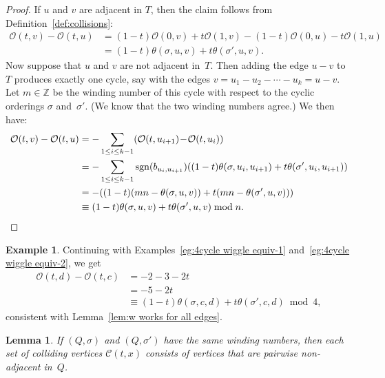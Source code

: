 \documentclass[11pt, letterpaper]{amsart}
\newtheorem{lemma}[theorem]{Lemma}
\theoremstyle{definition}
\newtheorem{example}[theorem]{Example}
\numberwithin{equation}{section}
\def\ZZ{{\mathbb Z}}
\def\O{{\mathcal{O}}}
\newcommand\sgn{\operatorname{sgn}}
\begin{document}
\begin{proof}
If $u$ and $v$ are adjacent in $T$, then the claim follows from Definition~\ref{def:collisions}:
\begin{align*}
\O(t,v)-\O(t,u) &= (1-t) \O(0,v)+t\O(1,v) - (1-t)\O(0,u) - t\O(1,u) \\
&= (1-t) \theta(\sigma,u,v) + t \theta(\sigma',u,v). 
\end{align*}
Now suppose that $u$ and $v$ are not adjacent in~$T$. 
Then adding the edge $u-v$ to~$T$ produces exactly one cycle,
say with the edges $v = u_1 - u_2 - \cdots - u_k=u - v$. %
Let $m\in\ZZ$ be the winding number of this cycle with respect to the cyclic orderings
$\sigma$ and~$\sigma'$. (We know that the two winding numbers agree.) 
We then have:
\begin{align*}
\O(t,v)-\O(t,u) 
&= -\sum_{1\le i\le k-1} (\O(t,u_{i+1})\!-\! \O(t,u_{i})) \\
&= -\sum_{1\le i\le k-1} \sgn(b_{u_i, u_{i+1}}) ((1-t)  \theta(\sigma , u_i, u_{i+1}) + t \theta(\sigma',u_i,u_{i+1})) \\
&= - ((1-t)(mn-\theta(\sigma,u,v)) + t (mn - \theta(\sigma',u,v))) \\
&\equiv (1-t) \theta(\sigma,u,v) + t \theta(\sigma',u,v) \bmod n. \qedhere
\end{align*}
\end{proof}

\begin{example}
\label{eg:4cycle wiggle equiv-3}
Continuing with Examples~\ref{eg:4cycle wiggle equiv-1} and~\ref{eg:4cycle wiggle equiv-2}, we get
\begin{align*}
\O(t,d) - \O(t,c) &= -2 - 3 - 2t \\
&= -5-2t \\
&\equiv (1-t) \theta(\sigma,c,d)+ t \theta(\sigma',c,d) \bmod 4,
\end{align*}
consistent with Lemma~\ref{lem:w works for all edges}.
\end{example}

\begin{lemma}
\label{lem:colliding set disjoint}
If $(Q, \sigma)$ and $(Q, \sigma')$ have the same winding numbers, %
then each set of colliding vertices $\mathcal{C}(t,x)$ consists of vertices that are pairwise non-adjacent in~$Q$.
\end{lemma}
\end{document}
